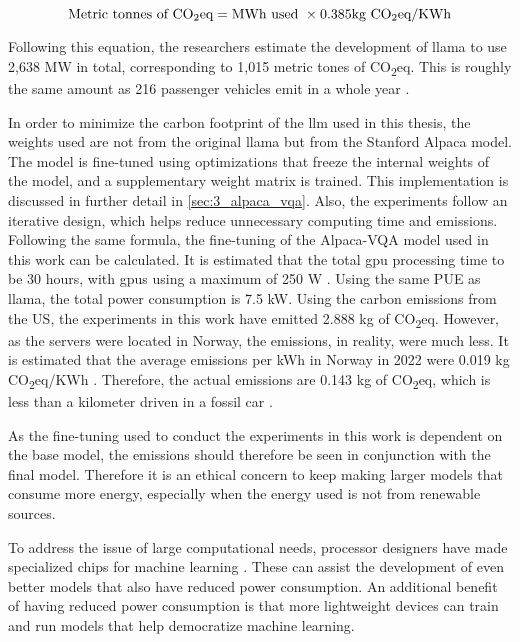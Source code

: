 \begin{equation}
    \text{Metric tonnes of CO\textsubscript{2}eq} = \text{MWh used } \times 0.385 \text{kg CO\textsubscript{2}eq/KWh}
    \label{eq:tonnes_co2}
\end{equation}

 
Following this equation, the researchers estimate the development of \gls{llama} to use 2,638 MW in total, corresponding to 1,015 metric tones of CO\textsubscript{2}eq.
This is roughly the same amount as 216 passenger vehicles emit in a whole year \cite{usepaGreenhouseGasEmissions2016}.

In order to minimize the carbon footprint of the \gls{llm} used in this thesis,
the weights used are not from the original \gls{llama} but from the Stanford Alpaca model. 
The model is fine-tuned using optimizations that freeze the internal weights of the model, and a supplementary weight matrix is trained. This implementation is discussed in further detail in \autoref{sec:3_alpaca_vqa}. Also, the experiments follow an iterative design, which helps reduce unnecessary computing time and emissions.
Following the same formula, the fine-tuning of the Alpaca-VQA model used in this work can be calculated. 
It is estimated that the total \gls{gpu} processing time to be 30 hours, with \glspl{gpu} using a maximum of 250 W \cite{Nvidiaa100datasheet}. Using the same PUE as \gls{llama}, the total power consumption is 7.5 kW. 
Using the carbon emissions from the US, the experiments in this work have emitted 2.888 kg of CO\textsubscript{2}eq. 
However, as the servers were located in Norway, the emissions, in reality, were much less. It is estimated that the average emissions per kWh in Norway in 2022 were 0.019 kg CO\textsubscript{2}eq/KWh \cite{LavtKlimagassutslippKnyttet}. Therefore, the actual emissions are 0.143 kg of CO\textsubscript{2}eq, which is less than a kilometer driven in a fossil car \cite{HvaPavirkerUtslipp2017}.


As the fine-tuning used to conduct the experiments in this work is dependent on the base model, the emissions should therefore be seen in conjunction with the final model. 
Therefore it is an ethical concern to keep making larger models that consume more energy, especially when the energy used is not from renewable sources.


To address the issue of large computational needs, processor designers have made specialized chips for machine learning \cite{byunBenchmarkingDataAnalysis2017, jouppiMotivationEvaluationFirst2018, elsterNvidiaHopperGPU2022, kasperekComparisonUsabilityApple2022}. These can assist the development of even better models that also have reduced power consumption. An additional benefit of having reduced power consumption is that more lightweight devices can train and run models that help democratize machine learning. 






